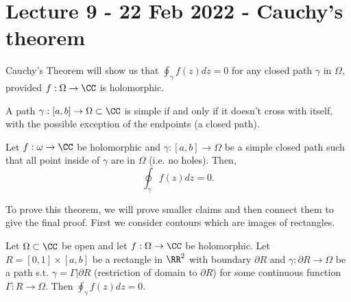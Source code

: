 \section{Lecture 9 - 22 Feb 2022 - Cauchy's theorem}
Cauchy's Theorem will show us that $\oint_{\gamma} f(z)dz=0$ for any closed path
$\gamma$ in $\Omega$, provided $f:\Omega\to\CC$ is holomorphic.
\begin{definition}
  A path $\gamma:[a,b]\to\Omega\subset\CC$ is simple if and only if it doesn't
  cross with itself, with the possible exception of the endpoints (a closed
  path).
  \label{def:simplePath}
\end{definition}
\begin{theorem}
  Let $f:\omega\to\CC$ be holomorphic and $\gamma:[a,b]\to\Omega$ be a simple
  closed path such that all point inside of $\gamma$ are in $\Omega$ (i.e. no
  holes). Then,
  \[\oint_{\gamma}f(z)dz =0.\]
  \label{thm:CauchyIntegration}
\end{theorem}
To prove this theorem, we will prove smaller claims and then connect them to
give the final proof. First we consider contours which are images of rectangles.
\begin{theorem}
  Let $\Omega\subset\CC$ be open and let $f:\Omega\to\CC$ be holomorphic. Let
  $R=[0,1]\times[a,b]$ be a rectangle in $\RR^2$ with boundary $\partial R$ and
  $\gamma: \partial R\to\Omega$ be a path s.t. $\gamma=\Gamma|\partial R$
  (restriction of domain to $\partial R$) for some continuous function $\Gamma:
  R\to\Omega$. Then $\oint_{\gamma}f(z)dz=0$.
  \label{thm:CauchyIntegrationRectangles}
\end{theorem}
